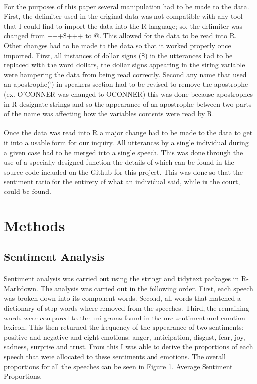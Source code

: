 \documentclass[12pt,english]{article}
\begin{document}
\paragraph{}
For the purposes of this paper several manipulation had to be made to the data. First, the delimiter used in the original data was not compatible with any tool that I could find to import the data into the R language; so, the delimiter was changed from +++\$+++ to @. This allowed for the data to be read into R. Other changes had to be made to the data so that it worked properly once imported. First, all instances of dollar signs (\$) in the utterances had to be replaced with the word dollars, the dollar signs appearing in the string variable were hampering the data from being read correctly. Second any name that used an apostrophe(') in speakers section had to be revised to remove the apostrophe (ex. O'CONNER was changed to OCONNER) this was done because apostrophes in R designate strings and so the appearance of an apostrophe between two parts of the name was affecting how the variables contents were read by R.
\paragraph{}
Once the data was read into R a major change had to be made to the data to get it into a usable form for our inquiry. All utterances by a single individual during a given case had to be merged into a single speech. This was done through the use of a specially designed function the details of which can be found in the source code included on the Github for this project. This was done so that the sentiment ratio for the entirety of what an individual said, while in the court, could be found. 
\section{Methods}
\subsection{Sentiment Analysis}
\paragraph{}
Sentiment analysis was carried out using the stringr and tidytext packages in R-Markdown. The analysis was carried out in the following order. First, each speech was broken down into its component words. Second, all words that matched a dictionary of stop-words where removed from the speeches. Third, the remaining words were compared to the uni-grams found in the nrc sentiment and emotion lexicon. This then returned the frequency of the appearance of two sentiments: positive and negative and eight emotions: anger, anticipation, disgust, fear, joy, sadness, surprise and trust.
From this I was able to derive the proportions of each speech that were allocated to these sentiments and emotions. The overall proportions for all the speeches can be seen in Figure 1. Average Sentiment Proportions. 
\end{document}

